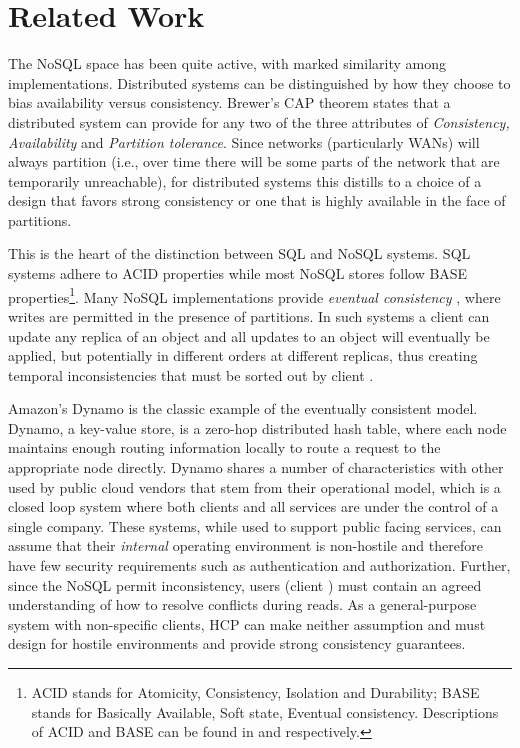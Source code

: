 
\section{Related Work} \label{s:relwork}

The NoSQL space has been quite active, with marked similarity among implementations. Distributed systems can be distinguished by how they choose to bias availability versus consistency. Brewer's CAP theorem \cite{Gilbert:2002:BCF:564585.564601} states that a distributed system can provide for any two of the three attributes of \emph{Consistency, Availability} and \emph{Partition tolerance}. Since networks (particularly WANs) will always partition (i.e., over time there will be some parts of the network that are temporarily unreachable), for distributed systems this distills to a choice of a design that favors strong consistency or one that is highly available in the face of partitions.

This is the heart of the distinction between SQL and NoSQL systems. SQL systems adhere to ACID properties while most NoSQL stores follow BASE properties\footnote{ACID stands for Atomicity, Consistency, Isolation and Durability; BASE stands for Basically Available, Soft state, Eventual consistency. Descriptions of ACID and BASE can be found in \cite{Wright:2007:EAS:1242520.1242521} and \cite{Cattell:2011:SSN:1978915.1978919} respectively.}. Many NoSQL implementations provide \emph{eventual consistency} \cite{Vogels:2008:EC:1466443.1466448}, where writes are permitted in the presence of partitions. In such systems a client can update any replica of an object and all updates to an object will eventually be applied, but potentially in different orders at different replicas, thus creating temporal inconsistencies that must be sorted out by client \apps{} \cite{Cooper:2008:PYH:1454159.1454167}.

Amazon's Dynamo \cite{DeCandia:2007:DAH:1323293.1294281} is the classic example of the eventually consistent model. Dynamo, a key-value store, is a zero-hop distributed hash table, where each node maintains enough routing information locally to route a request to the appropriate node directly. Dynamo shares a number of characteristics with other \dos{} used by public cloud vendors that stem from their operational model, which is a closed loop system where both clients and all services are under the control of a single company. These systems, while used to support public facing services, can assume that their \emph{internal} operating environment is non-hostile and therefore have few security requirements such as authentication and authorization. Further, since the NoSQL \oss{} permit inconsistency, users (client \apps{}) must contain an agreed understanding of how to resolve conflicts during reads. As a general-purpose system with non-specific clients, HCP can make neither assumption and must design for hostile environments and provide strong consistency guarantees.

